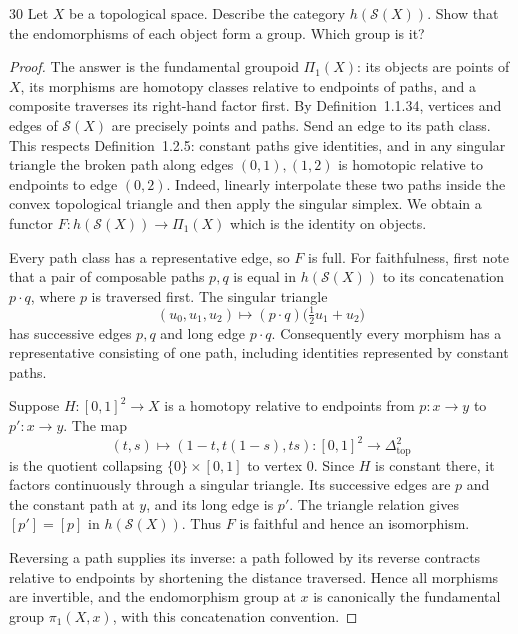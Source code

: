 \begin{exercise}{30}
Let $X$ be a topological space. Describe the category $h(\mathcal S(X))$.
Show that the endomorphisms of each object form a group. Which group is it?

\begin{proof}
The answer is the fundamental groupoid $\Pi_1(X)$: its objects
are points of $X$, its morphisms are homotopy classes relative
to endpoints of paths, and a composite traverses its right-hand
factor first.
By Definition~1.1.34, vertices and edges of $\mathcal S(X)$ are
precisely points and paths. Send an edge to its path class.
This respects Definition~1.2.5: constant paths give identities,
and in any singular triangle the broken path along edges
$(0,1),(1,2)$ is homotopic relative to endpoints to edge $(0,2)$.
Indeed, linearly interpolate these two paths inside the convex
topological triangle and then apply the singular simplex.
We obtain a functor $F\colon h(\mathcal S(X))\to\Pi_1(X)$
which is the identity on objects.

Every path class has a representative edge, so $F$ is full.
For faithfulness, first note that a pair of composable paths
$p,q$ is equal in $h(\mathcal S(X))$ to its concatenation
$p\cdot q$, where $p$ is traversed first. The singular triangle
\[
 (u_0,u_1,u_2)\longmapsto
 (p\cdot q)\bigl(\tfrac12u_1+u_2\bigr)
\]
has successive edges $p,q$ and long edge $p\cdot q$.
Consequently every morphism has a representative consisting
of one path, including identities represented by constant paths.

Suppose $H\colon[0,1]^2\to X$ is a homotopy relative to
endpoints from $p\colon x\to y$ to $p'\colon x\to y$.
The map
\[
 (t,s)\longmapsto(1-t,t(1-s),ts)
 \colon[0,1]^2\longrightarrow\Delta^2_{\mathrm{top}}
\]
is the quotient collapsing $\{0\}\times[0,1]$ to vertex $0$.
Since $H$ is constant there, it factors continuously through
a singular triangle. Its successive edges are $p$ and the
constant path at $y$, and its long edge is $p'$.
The triangle relation gives $[p']=[p]$ in $h(\mathcal S(X))$.
Thus $F$ is faithful and hence an isomorphism.

Reversing a path supplies its inverse: a path followed by its
reverse contracts relative to endpoints by shortening the
distance traversed. Hence all morphisms are invertible, and
the endomorphism group at $x$ is canonically the fundamental
group $\pi_1(X,x)$, with this concatenation convention.
\end{proof}
\end{exercise}
